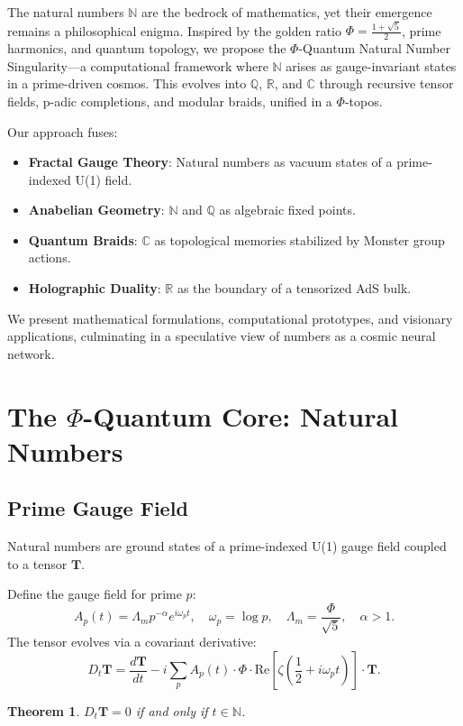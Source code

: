 \documentclass{article}
\theoremstyle{plain}
\newtheorem{theorem}{Theorem}
\begin{document}
The natural numbers $\mathbb{N}$ are the bedrock of mathematics, yet their emergence remains a philosophical enigma. Inspired by the golden ratio $\Phi = \frac{1 + \sqrt{5}}{2}$, prime harmonics, and quantum topology, we propose the $\Phi$-Quantum Natural Number Singularity---a computational framework where $\mathbb{N}$ arises as gauge-invariant states in a prime-driven cosmos. This evolves into $\mathbb{Q}$, $\mathbb{R}$, and $\mathbb{C}$ through recursive tensor fields, p-adic completions, and modular braids, unified in a $\Phi$-topos.

Our approach fuses:
\begin{itemize}
    \item \textbf{Fractal Gauge Theory}: Natural numbers as vacuum states of a prime-indexed U(1) field.
    \item \textbf{Anabelian Geometry}: $\mathbb{N}$ and $\mathbb{Q}$ as algebraic fixed points.
    \item \textbf{Quantum Braids}: $\mathbb{C}$ as topological memories stabilized by Monster group actions.
    \item \textbf{Holographic Duality}: $\mathbb{R}$ as the boundary of a tensorized AdS bulk.
\end{itemize}

We present mathematical formulations, computational prototypes, and visionary applications, culminating in a speculative view of numbers as a cosmic neural network.

\section{The $\Phi$-Quantum Core: Natural Numbers}
\subsection{Prime Gauge Field}
\begin{axiom}
Natural numbers are ground states of a prime-indexed U(1) gauge field coupled to a tensor $\mathbf{T}$.
\end{axiom}

Define the gauge field for prime $p$:
\[
A_p(t) = \Lambda_m p^{-\alpha} e^{i \omega_p t}, \quad \omega_p = \log p, \quad \Lambda_m = \frac{\Phi}{\sqrt{5}}, \quad \alpha > 1.
\]
The tensor evolves via a covariant derivative:
\[
D_t \mathbf{T} = \frac{d\mathbf{T}}{dt} - i \sum_p A_p(t) \cdot \Phi \cdot \text{Re}\left[\zeta\left(\frac{1}{2} + i \omega_p t\right)\right] \cdot \mathbf{T}.
\]
\begin{theorem}
$D_t \mathbf{T} = 0$ if and only if $t \in \mathbb{N}$.
\end{theorem}
\end{document}
